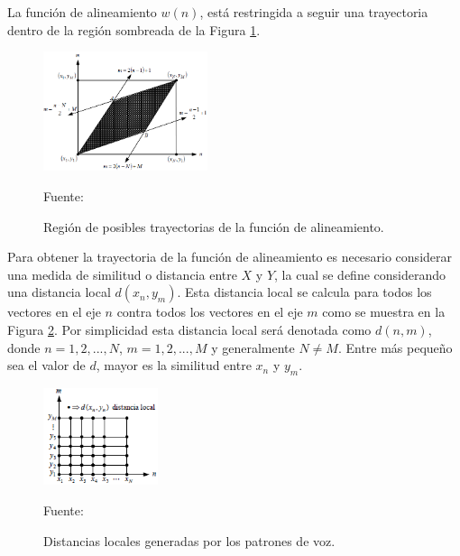 \begin{enumerate}
La función de alineamiento $w(n)$, está restringida a seguir una trayectoria dentro de la región sombreada de la Figura \ref{fig:figura2.46}.
\begin{figure}[H]
\begin{center}
\includegraphics[width=0.43\textwidth]{Imagenes/Cap2/image047}
\end{center}
\begin{center}
\vskip -0.5cm
\caption{\small{Región de posibles trayectorias de la función de alineamiento.}}
\label{fig:figura2.46}
{\small{Fuente: \cite{rabiner}}}
\end{center}
\end{figure}
\newpage
Para obtener la trayectoria de la función de alineamiento es necesario considerar una medida de similitud o distancia entre $X$ y $Y$, la cual se define considerando una distancia local $d(x_{n},y_{m})$. Esta distancia local se calcula para todos los vectores en el eje $n$ contra todos los vectores en el eje $m$ como se muestra en la Figura \ref{fig:figura2.47}. Por simplicidad esta distancia local será denotada como $d(n, m)$, donde $n = 1,2,...,N$, $m = 1,2,...,M$ y generalmente $N \neq M$. Entre más pequeño sea el valor de $d$, mayor es la similitud entre $x_{n}$ y $y_{m}$.
\begin{figure}[H]
\begin{center}
\includegraphics[width=0.3\textwidth]{Imagenes/Cap2/image048}
\end{center}
\begin{center}
\vskip -0.5cm
\caption{\small{Distancias locales generadas por los patrones de voz.}}
\label{fig:figura2.47}
{\small{Fuente: \cite{rabiner}}}
\end{center}
\end{figure}

\end{enumerate}
